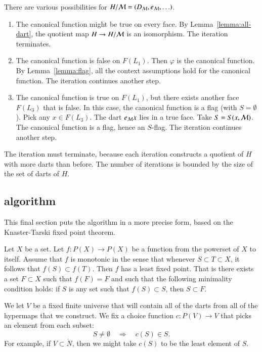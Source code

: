 There are various possibilities for $H/{\cal M} = (D_{\cal M},e_{\cal M},\ldots)$.
\begin{enumerate}
\item  The canonical function might be true on every face.  By Lemma~\ref{lemma:all-dart}, the quotient map $H\to H/{\cal M}$ is an isomorphism.  The iteration terminates.
\item The canonical function is false on $F(L_1)$.  Then $\varphi$ is the canonical function.  By Lemma~\ref{lemma:flag}, all the context assumptions hold for the canonical function.  The iteration continues another step.
\item The canonical function is true on $F(L_1)$, but there exists another face $F(L_3)$ that is false.  In this case, the canonical function is a flag (with $S=\emptyset$).  Pick any $x\in F(L_3)$.  The dart $e_{\cal M} x$ lies in a true face.  Take $S=S(x,{\cal M})$.  The canonical function is a flag, hence an $S$-flag.  The iteration continues another step.
\end{enumerate}

The iteration must terminate, because each iteration constructs a quotient of $H$ with more darts than before.  The number of iterations is bounded by the size of the set of darts of $H$.

\subsection{algorithm}

This final section puts the algorithm in a more precise form, based on the Knaster-Tarski fixed point theorem.

\begin{lemma}   Let $X$ be a set.  Let $f:P(X)\to P(X)$ be a function from the powerset of $X$ to itself.  Assume that $f$ is monotonic in the sense that whenever $S\subset T\subset X$, it follows that
$f(S) \subset f(T)$.  Then $f$ has a least fixed point.  That is there exists a set $F\subset X$ such that $f(F) = F$ and such that the following minimality condition holds: if $S$ is any set such that $f(S) \subset S$, then $S\subset F$.
\end{lemma}

We let $V$ be a fixed finite universe that will contain all of the darts from all of the hypermaps that we construct.  We fix a choice function $c:P(V)\to V$ that picks an element from each subset:
$$
S\ne\emptyset\quad  \Rightarrow \quad  c(S)\in S.
$$
For example, if $V\subset\ring{N}$, then we might take $c(S)$ to be the least element of $S$.

